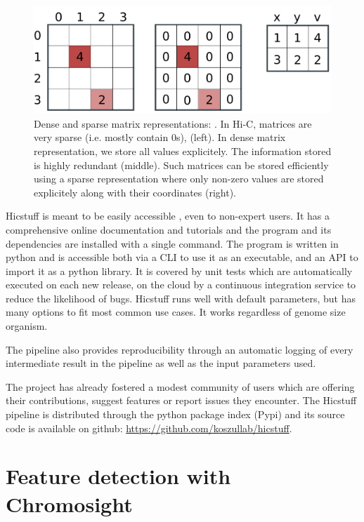 \begin{figure}[htb]
    \includegraphics[width=\textwidth]{Parts/Part02/gfx/hicstuff/dense_sparse.pdf}
    \caption[Dense and sparse matrix representations.]{Dense and sparse matrix representations: . In Hi-C, matrices are very sparse (i.e. mostly contain 0s), (left). In dense matrix representation, we store all values explicitely. The information stored is highly redundant (middle). Such matrices can be stored efficiently using a sparse representation where only non-zero values are stored explicitely along with their coordinates (right).}
    \label{fig:02-01:sparse}
\end{figure}

Hicstuff is meant to be easily accessible \cite{matthey-doretSimpleLibraryPipeline2021}, even to non-expert users. It has a comprehensive online documentation and tutorials and the program and its dependencies are installed with a single command. The program is written in python and is accessible both via a \acrfull{CLI} to use it as an executable, and an \acrfull{API} to import it as a python library. It is covered by unit tests which are automatically executed on each new release, on the cloud by a continuous integration service to reduce the likelihood of bugs. Hicstuff runs well with default parameters, but has many options to fit most common use cases. It works regardless of genome size organism.

The pipeline also provides reproducibility through an automatic logging of every intermediate result in the pipeline as well as the input parameters used.

The project has already fostered a modest community of users which are offering their contributions, suggest features or report issues they encounter. The Hicstuff pipeline is distributed through the python package index (Pypi) and its source code is available on github: \url{https://github.com/koszullab/hicstuff}.

\FloatBarrier
\section{Feature detection with Chromosight}

